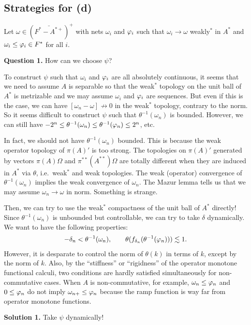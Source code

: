 \documentclass{../../../../small}
\begin{document}
\subsection{Strategies for (d)}

Let $\omega\in(\bar{F^*-A^{*+}})^+$ with nets $\omega_i$ and $\varphi_i$ such that $\omega_i\to\omega$ weakly$^*$ in $A^*$ and $\omega_i\le\varphi_i\in F^*$ for all $i$.



\noindent\textbf{Question 1.}
How can we choose $\psi$?

To construct $\psi$ such that $\omega_i$ and $\varphi_i$ are all absolutely continuous, it seems that we need to assume $A$ is separable so that the weak$^*$ topology on the unit ball of $A^*$ is metrizable and we may assume $\omega_i$ and $\varphi_i$ are sequences.
But even if this is the case, we can have $[\omega_n-\omega]\not\to0$ in the weak$^*$ topology, contrary to the norm.
So it seems difficult to construct $\psi$ such that $\theta^{-1}(\omega_n)$ is bounded.
However, we can still have $-2^n\le\theta^{-1}(\omega_n)\le\theta^{-1}(\varphi_n)\le2^n$, etc.

In fact, we should not have $\theta^{-1}(\omega_n)$ bounded.
This is because the weak operator topology of $\pi(A)'$ is too strong.
The topologies on $\pi(A)'$ generated by vectors $\pi(A)\Omega$ and $\pi^{**}(A^{**})\Omega$ are totally different when they are induced in $A^*$ via $\theta$, i.e.~weak$^*$ and weak topologies.
The weak (operator) convergence of $\theta^{-1}(\omega_n)$ implies the weak convergence of $\omega_n$.
The Mazur lemma tells us that we may assume $\omega_n\to\omega$ in norm.
Something is strange.

Then, we can try to use the weak$^*$ compactness of the unit ball of $A^*$ directly!
Since $\theta^{-1}(\omega_n)$ is unbounded but controllable, we can try to take $\delta$ dynamically.
We want to have the following properties:
\[-\delta_n<\theta^{-1}(\omega_n),\qquad\theta(f_{\delta_n}(\theta^{-1}(\varphi_n)))\lesssim1.\]
However, it is desparate to control the norm of $\theta(k)$ in terms of $k$, except by the norm of $k$.
Also, by the ``stiffness'' or ``rigidness'' of the operator monotone functional calculi, two conditions are hardly satisfied simultaneously for non-commutative cases.
When $A$ is non-commutative, for example, $\omega_n\le\varphi_n$ and $0\le\varphi_n$ do not imply $\omega_{n+}\le\varphi_n$ because the ramp function is way far from operator monotone functions.

\noindent\textbf{Solution 1.}
Take $\psi$ dynamically!
\end{document}
